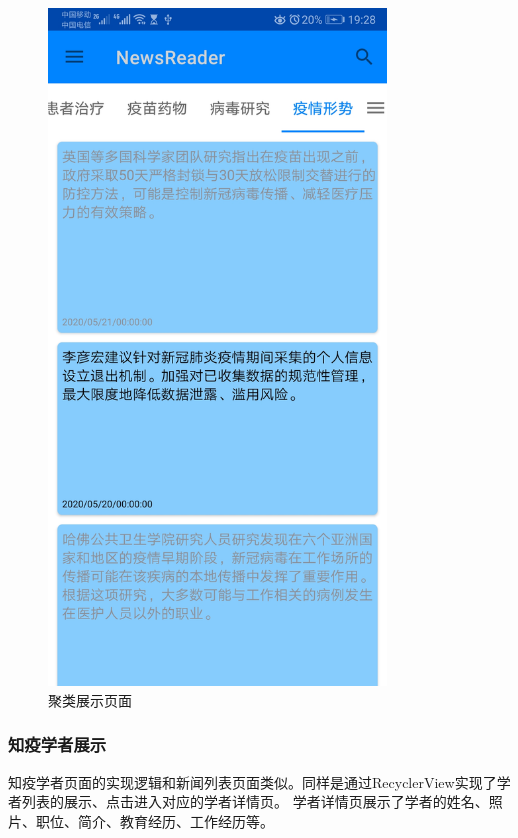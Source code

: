 \documentclass[UTF8]{article}
\begin{document}
\begin{figure}[htbp]
{\begin{minipage}[t]{0.25\linewidth}
    \includegraphics[width=0.8\textwidth]{cluster4}
    \end{minipage}%
    }%

    \centering
    \caption{聚类展示页面}
    \end{figure}


\subsubsection{知疫学者展示}
知疫学者页面的实现逻辑和新闻列表页面类似。同样是通过RecyclerView实现了学者列表的展示、点击进入对应的学者详情页。
学者详情页展示了学者的姓名、照片、职位、简介、教育经历、工作经历等。
\end{document}
